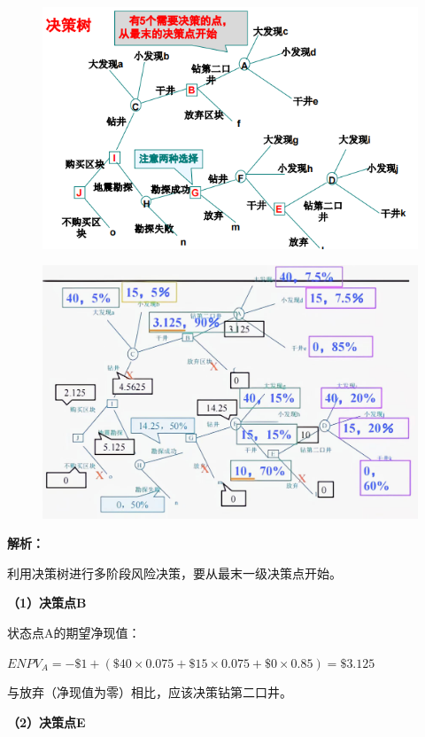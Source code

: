 \begin{figure}[H]
    \centering
    \includegraphics[width=1\linewidth]{image/决策树1-例1.png}
\end{figure}

\begin{figure}[H]
    \centering
    \includegraphics[width=1\linewidth]{image/决策树2-例1.jpg}
\end{figure}

\noindent \textbf{解析：}

利用决策树进行多阶段风险决策，要从最末一级决策点开始。

\textbf{（1）决策点B}

状态点A的期望净现值：

$ENPV_A=-\$1+(\$40×0.075+\$15×0.075+\$0×0.85)=\$3.125$

与放弃（净现值为零）相比，应该决策钻第二口井。

\textbf{（2）决策点E}

